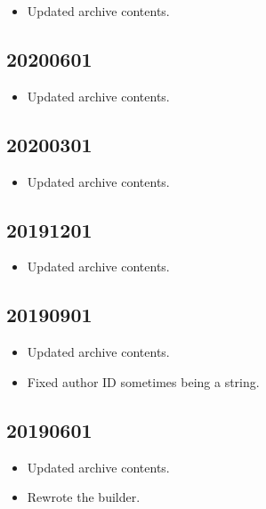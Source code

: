 \documentclass[hidelinks,a4paper,12pt]{article}
\begin{document}
\begin{itemize}
\item Updated archive contents.
\end{itemize}

\subsection{20200601}  \label{sec:changelog_20200601}

\begin{itemize}
\item Updated archive contents.
\end{itemize}

\subsection{20200301}  \label{sec:changelog_20200301}

\begin{itemize}
\item Updated archive contents.
\end{itemize}

\subsection{20191201}  \label{sec:changelog_20191201}

\begin{itemize}
\item Updated archive contents.
\end{itemize}

\subsection{20190901}  \label{sec:changelog_20190901}

\begin{itemize}
\item Updated archive contents.
\item Fixed author ID sometimes being a string.
\end{itemize}

\subsection{20190601}  \label{sec:changelog_20190601}

\begin{itemize}
\item Updated archive contents.
\item Rewrote the builder.
\end{itemize}
\end{document}
